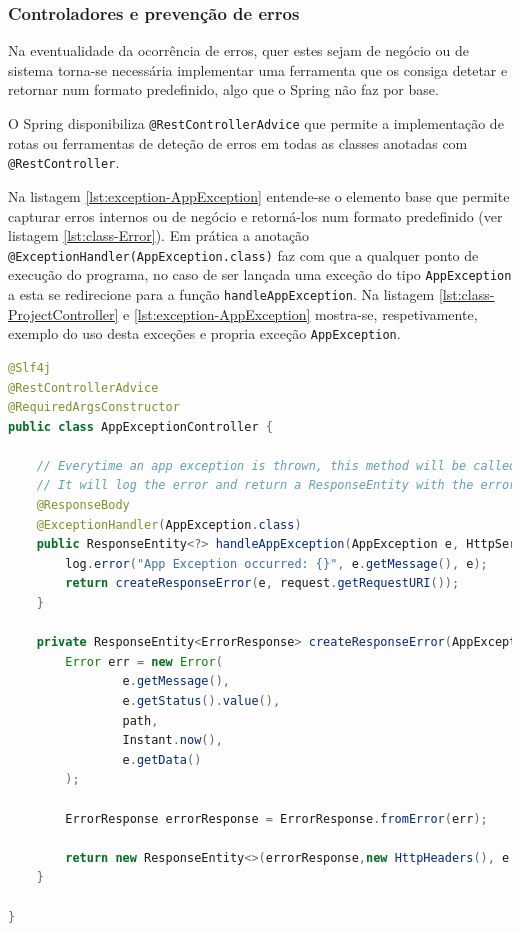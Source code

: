 \subsubsection{Controladores e prevenção de erros}

Na eventualidade da ocorrência de erros, quer estes sejam de negócio ou de sistema torna-se necessária implementar uma ferramenta que os consiga detetar e retornar num formato predefinido, algo que o \gls{Spring} não faz por base. 

O \gls{Spring} disponibiliza \lstinline|@RestControllerAdvice| que permite a implementação de rotas ou ferramentas de deteção de erros em todas as classes anotadas com \lstinline|@RestController|.

Na listagem \ref{lst:exception-AppException} entende-se o elemento base que permite capturar erros internos ou de negócio e retorná-los num formato predefinido (ver listagem \ref{lst:class-Error}). Em prática a anotação \lstinline|@ExceptionHandler(AppException.class)| faz com que a qualquer ponto de execução do programa, no caso de ser lançada uma exceção do tipo \lstinline|AppException| a esta se redirecione para a função \lstinline|handleAppException|. Na listagem \ref{lst:class-ProjectController} e \ref{lst:exception-AppException} mostra-se, respetivamente, exemplo do uso desta exceções e propria exceção \lstinline|AppException|.

\begin{lstlisting}[language=Java, caption={Class \textit{AppExceptionController}}, label=lst:exception-AppException]
@Slf4j
@RestControllerAdvice
@RequiredArgsConstructor
public class AppExceptionController {

    // Everytime an app exception is thrown, this method will be called
    // It will log the error and return a ResponseEntity with the error details
    @ResponseBody
    @ExceptionHandler(AppException.class)
    public ResponseEntity<?> handleAppException(AppException e, HttpServletRequest request) {
        log.error("App Exception occurred: {}", e.getMessage(), e);
        return createResponseError(e, request.getRequestURI());
    }

    private ResponseEntity<ErrorResponse> createResponseError(AppException e, String path) {
        Error err = new Error(
                e.getMessage(),
                e.getStatus().value(),
                path,
                Instant.now(),
                e.getData()
        );

        ErrorResponse errorResponse = ErrorResponse.fromError(err);

        return new ResponseEntity<>(errorResponse,new HttpHeaders(), e.getStatus());
    }

}
\end{lstlisting}

